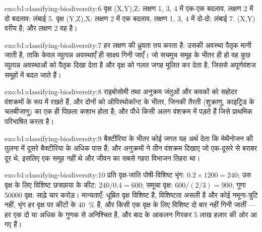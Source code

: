 \begin{solution}{exo:b1:classifying-biodiversity:6}
वृक्ष (X,Y),Z: लक्षण 1, 3, 4 में एक-एक बदलाव, लक्षण 2 में दो
बदलाव: लंबाई 5. वृक्ष (Y,Z),X: लक्षण 2 में एक बदलाव, लक्षण
1, 3, 4 में दो-दो: लंबाई 7. (X,Y) वरीय है; और लक्षण 2 वह
 है।
\end{solution}

\begin{solution}{exo:b1:classifying-biodiversity:7}
 हर लक्षण की ध्रुवता तय करता है: उसकी अवस्था
पैतृक मानी जाती है, ताकि केवल व्युत्पन्न अवस्थाएँ ही
साक्ष्य गिनी जाएँ। जो  सचमुच समूह के भीतर ही हो वह कुछ
व्युत्पन्न अवस्थाओं को पैतृक दिखा देता है और वृक्ष को गलत जगह मूलित कर
देता है, जिससे  अपूर्णवंशज समूहों में बदल जाते हैं।
\end{solution}

\begin{solution}{exo:b1:classifying-biodiversity:8}
राइबोसोमी तथा  अनुक्रम जंतुओं और कवकों को सहोदर वंशक्रमों के रूप
में रखते हैं, और दोनों को ऑपिस्थोकॉन्ट के भीतर, जिनकी तैरती 
(शुक्राणु, काइट्रिड के चलबीजाणु) का एक ही पिछला कशाभ होता है; और पौधे
किसी अलग वंशक्रम में पड़ते हैं जिसे प्राथमिक  परिभाषित करता है।
\end{solution}

\begin{solution}{exo:b1:classifying-biodiversity:9}
बैक्टीरिया के भीतर कोई जगत यह अर्थ देता कि मेथैनोजन  की
तुलना में दूसरे बैक्टीरिया के अधिक पास हैं; और अनुक्रमों ने तीन
वंशक्रम दिखाए जो एक-दूसरे से बराबर दूर थे, इसलिए 
एक समूह नहीं थे और जीवन का सबसे गहरा विभाजन तिहरा था।
\end{solution}

\begin{solution}{exo:b1:classifying-biodiversity:10}
प्रति वृक्ष-जाति पोषी-विशिष्ट भृंग: $0.2\times 1200 = 240$;
उस वृक्ष के लिए विशिष्ट छत्रछाया के कीट: $240/0.4 = 600$; समूचा वृक्ष:
$600/(2/3) = 900$; गुणा \num{50000} वृक्ष: साढ़े चार करोड़।
मान्यताएँ: धूम्रित वृक्ष विशिष्ट है, विशिष्टता असली है
और कोई नमूना-त्रुटि नहीं, भृंग हर वृक्ष पर कीटों के \qty{40}{\%} हैं,
और किसी एक वृक्ष के लिए विशिष्ट  दो बार नहीं गिनी जातीं ---
हर एक दो या अधिक के गुणक से अनिश्चित है, और बाद के आकलन गिरकर
\num{5} लाख हज़ार की ओर आ गए हैं।
\end{solution}

